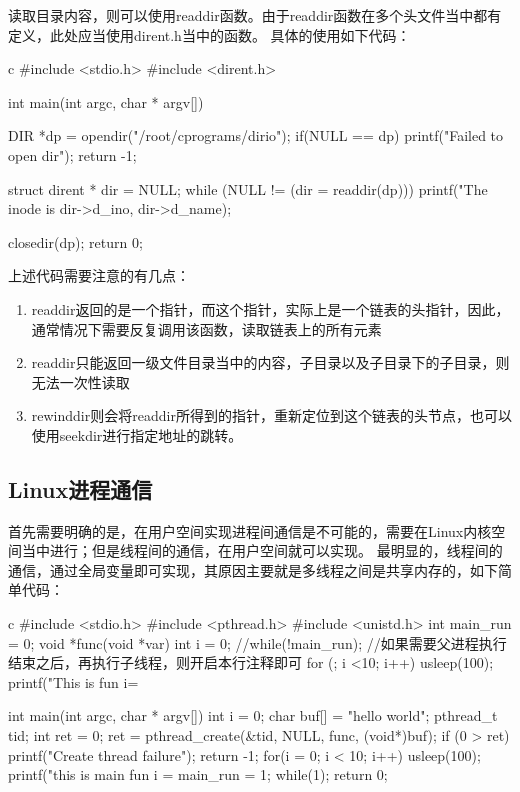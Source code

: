 读取目录内容，则可以使用readdir函数。由于readdir函数在多个头文件当中都有定义，此处应当使用dirent.h当中的函数。
具体的使用如下代码：
\begin{code-block}{c}
#include <stdio.h>
#include <dirent.h>

int main(int argc, char * argv[])
{
        DIR *dp = opendir("/root/cprograms/dirio");
        if(NULL ==  dp)
        {
                printf("Failed to open dir\n");
                return -1;
        }

        struct dirent * dir = NULL;
        while (NULL != (dir = readdir(dp)))
        {
                printf("The inode is %
                        dir->d_ino, dir->d_name);
        }

        closedir(dp);
        return 0;
}
\end{code-block}
上述代码需要注意的有几点：
\begin{enumerate}
  \item readdir返回的是一个指针，而这个指针，实际上是一个链表的头指针，因此，通常情况下需要反复调用该函数，读取链表上的所有元素
  \item readdir只能返回一级文件目录当中的内容，子目录以及子目录下的子目录，则无法一次性读取
  \item rewinddir则会将readdir所得到的指针，重新定位到这个链表的头节点，也可以使用seekdir进行指定地址的跳转。
\end{enumerate}

\subsection{Linux进程通信}
首先需要明确的是，在用户空间实现进程间通信是不可能的，需要在Linux内核空间当中进行；但是线程间的通信，在用户空间就可以实现。
最明显的，线程间的通信，通过全局变量即可实现，其原因主要就是多线程之间是共享内存的，如下简单代码：
\begin{code-block}{c}
#include <stdio.h>
#include <pthread.h>
#include <unistd.h>
int main_run = 0;
void *func(void *var)
{
        int i = 0;
        //while(!main_run); //如果需要父进程执行结束之后，再执行子线程，则开启本行注释即可
        for (; i <10; i++)
        {
                usleep(100);
                printf("This is fun i=%
        }
}

int main(int argc, char * argv[])
{
        int i = 0;
        char buf[] = "hello world\n";
        pthread_t tid;
        int ret = 0;
        ret = pthread_create(&tid, NULL, func, (void*)buf);
        if (0 > ret)
        {
                printf("Create thread failure\n");
                return -1;
        }
        for(i = 0; i < 10; i++)
        {
                usleep(100);
                printf("this is main fun i = %
        }
        main_run = 1;
        while(1);
        return 0;
}
\end{code-block}

